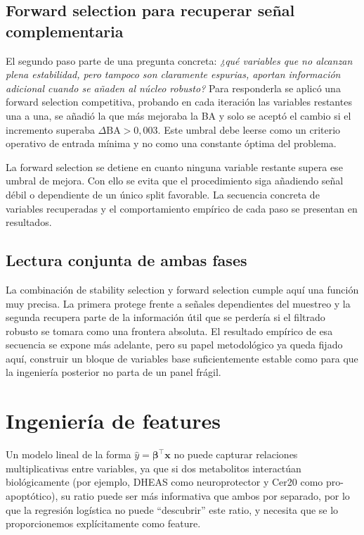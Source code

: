 \subsection{Forward selection para recuperar señal complementaria}

El segundo paso parte de una pregunta concreta: \textit{¿qué variables que no alcanzan plena estabilidad, pero tampoco
son claramente espurias, aportan información adicional cuando se añaden al núcleo robusto?} Para responderla se aplicó
una forward selection competitiva, probando en cada iteración las variables restantes una a una, se añadió la que más
mejoraba la BA y solo se aceptó el cambio si el incremento superaba $\Delta \text{BA} > 0{,}003$. Este umbral debe
leerse como un criterio operativo de entrada mínima y no como una constante óptima del problema.

La forward selection se detiene en cuanto ninguna variable restante supera ese umbral de mejora. Con ello se evita que
el procedimiento siga añadiendo señal débil o dependiente de un único split favorable. La secuencia concreta de
variables recuperadas y el comportamiento empírico de cada paso se presentan en resultados.

\subsection{Lectura conjunta de ambas fases}

La combinación de stability selection y forward selection cumple aquí una función muy precisa. La primera protege frente
a señales dependientes del muestreo y la segunda recupera parte de la información útil que se perdería si el filtrado
robusto se tomara como una frontera absoluta. El resultado empírico de esa secuencia se expone más adelante, pero su
papel metodológico ya queda fijado aquí, construir un bloque de variables base suficientemente estable como para que la
ingeniería posterior no parta de un panel frágil.

\section{Ingeniería de features}\label{sec:feature_engineering}

Un modelo lineal de la forma $\hat{y} = \boldsymbol{\beta}^\top \mathbf{x}$ no puede capturar relaciones multiplicativas
entre variables, ya que si dos metabolitos interactúan biológicamente (por ejemplo, DHEAS como neuroprotector y Cer20 como
pro-apoptótico), su ratio puede ser más informativa que ambos por separado, por lo que la regresión logística no puede
``descubrir'' este ratio, y necesita que se lo proporcionemos explícitamente como feature.

